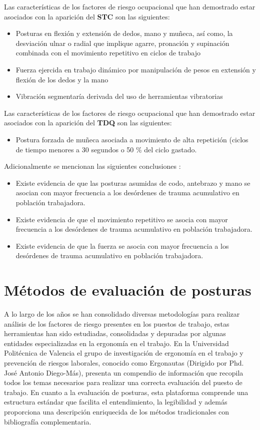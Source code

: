 Las características de los factores de riesgo ocupacional que han demostrado estar asociados con la aparición del \textbf{STC} son las siguientes:\parencite[45]{MinisteriodeProteccionSocialdeColombia2006GuiaSuperiores}
\begin{itemize}
\item Posturas en flexión y extensión de dedos, mano y muñeca, así como, la desviación ulnar o radial que implique agarre, pronación y supinación combinada con el movimiento repetitivo en ciclos de trabajo
\item Fuerza ejercida en trabajo dinámico por manipulación de pesos en extensión y flexión de los dedos y la mano
\item Vibración segmentaría derivada del uso de herramientas vibratorias
\end{itemize}
Las características de los factores de riesgo ocupacional que han demostrado estar asociados con la aparición del \textbf{TDQ} son las siguientes\parencite[45]{MinisteriodeProteccionSocialdeColombia2006GuiaSuperiores}:
\begin{itemize}
\item Postura forzada de muñeca asociada a movimiento de alta repetición (ciclos de tiempo menores a 30 segundos o 50 \% del ciclo gastado.
\end{itemize}
Adicionalmente se mencionan las siguientes conclusiones \parencite[46]{MinisteriodeProteccionSocialdeColombia2006GuiaSuperiores}:
\begin{itemize}
\item Existe evidencia de que las posturas asumidas de codo, antebrazo y mano se asocian con mayor frecuencia a los desórdenes de trauma acumulativo en población trabajadora.
\item Existe evidencia de que el movimiento repetitivo se asocia con mayor frecuencia a los desórdenes de trauma acumulativo en población trabajadora.
\item Existe evidencia de que la fuerza se asocia con mayor frecuencia a los desórdenes de trauma acumulativo en población trabajadora.
\end{itemize}

\section{Métodos de evaluación de posturas}
A lo largo de los años se han consolidado diversas metodologías para realizar análisis de los factores de riesgo presentes en los puestos de trabajo, estas herramientas han sido estudiadas, consolidadas y depuradas por algunas entidades especializadas en la ergonomía en el trabajo. En la Universidad Politécnica de Valencia el grupo de investigación de ergonomía en el trabajo y prevención de riesgos laborales, conocido como Ergonautas (Dirigido por Phd. José Antonio Diego-Más), presenta un compendio de información que recopila todos los temas necesarios para realizar una correcta evaluación del puesto de trabajo. En cuanto a la evaluación de posturas, esta plataforma comprende una estructura estándar que facilita el entendimiento, la legibilidad y además proporciona una descripción enriquecida de los métodos tradicionales con bibliografía complementaria. 


